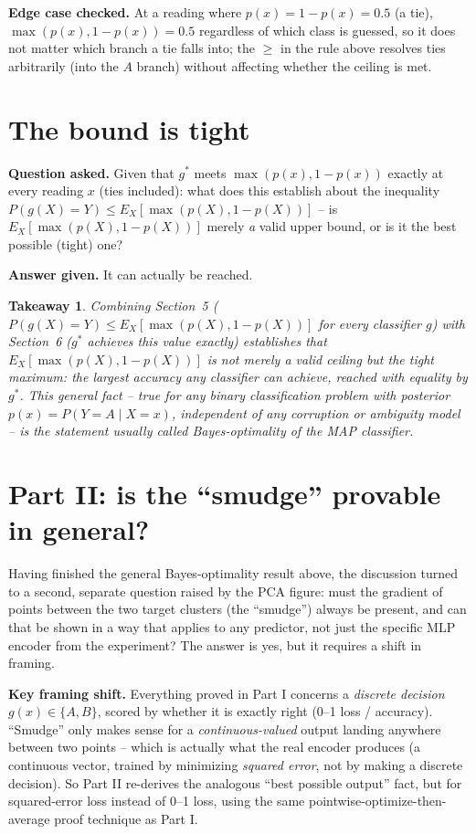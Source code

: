 \documentclass[11pt]{article}
\newtheorem*{takeaway}{Takeaway}
\begin{document}
\textbf{Edge case checked.} At a reading where $p(x) = 1-p(x) = 0.5$ (a
tie), $\max(p(x),1-p(x)) = 0.5$ regardless of which class is guessed, so it
does not matter which branch a tie falls into; the $\ge$ in the rule above
resolves ties arbitrarily (into the $A$ branch) without affecting whether
the ceiling is met.

\section{The bound is tight}

\textbf{Question asked.} Given that $g^\ast$ meets $\max(p(x), 1-p(x))$
exactly at every reading $x$ (ties included): what does this establish
about the inequality $P(g(X)=Y) \le E_X[\max(p(X),1-p(X))]$ -- is
$E_X[\max(p(X),1-p(X))]$ merely \emph{a} valid upper bound, or is it the
best possible (tight) one?

\textbf{Answer given.} It can actually be reached.

\begin{takeaway}
Combining Section~5 ($P(g(X)=Y) \le E_X[\max(p(X),1-p(X))]$ for every
classifier $g$) with Section~6 ($g^\ast$ achieves this value exactly)
establishes that $E_X[\max(p(X),1-p(X))]$ is not merely a valid ceiling but
the tight maximum: the largest accuracy any classifier can achieve, reached
with equality by $g^\ast$. This general fact -- true for any binary
classification problem with posterior $p(x)=P(Y=A\mid X=x)$, independent of
any corruption or ambiguity model -- is the statement usually called
\emph{Bayes-optimality of the MAP classifier}.
\end{takeaway}

\section{Part II: is the ``smudge'' provable in general?}

Having finished the general Bayes-optimality result above, the discussion
turned to a second, separate question raised by the PCA figure: must the
gradient of points between the two target clusters (the ``smudge'') always
be present, and can that be shown in a way that applies to any predictor,
not just the specific MLP encoder from the experiment? The answer is yes,
but it requires a shift in framing.

\textbf{Key framing shift.} Everything proved in Part I concerns a
\emph{discrete decision} $g(x)\in\{A,B\}$, scored by whether it is exactly
right (0--1 loss / accuracy). ``Smudge'' only makes sense for a
\emph{continuous-valued} output landing anywhere between two points --
which is actually what the real encoder produces (a continuous vector,
trained by minimizing \emph{squared error}, not by making a discrete
decision). So Part II re-derives the analogous ``best possible output''
fact, but for squared-error loss instead of 0--1 loss, using the same
pointwise-optimize-then-average proof technique as Part I.
\end{document}
